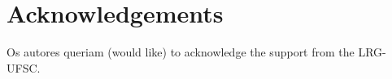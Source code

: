 \documentclass{doublecol-new}
\def\newblock{\hskip .11em plus .33em minus .07em}
\begin{document}
\section*{Acknowledgements}
Os autores queriam (would like) to acknowledge the support from the LRG-UFSC.

%
%
%
%
%
%





                                 
%	
%
%
	
\end{document}
